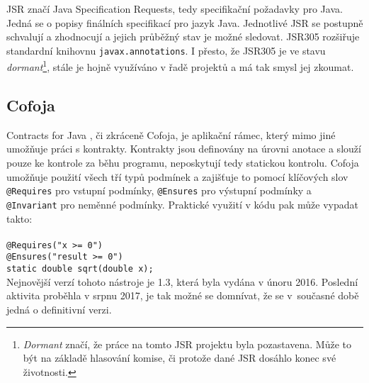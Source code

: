 			JSR značí Java Specification Requests, tedy specifikační požadavky pro Java. Jedná se o popisy finálních specifikací pro jazyk Java. Jednotlivé JSR se postupně schvalují a zhodnocují a jejich průběžný stav je možné sledovat. JSR305 rozšiřuje standardní knihovnu \texttt{javax.annotations}. I přesto, že JSR305 je ve stavu \emph{dormant}\footnote{\emph{Dormant} značí, že práce na tomto JSR projektu byla pozastavena. Může to být na základě hlasování komise, či protože dané JSR dosáhlo konec své životnosti.}, stále je hojně využíváno v řadě projektů a má tak smysl jej zkoumat.
			
	
		\subsection{Cofoja}
			Contracts for Java \cite{cofoja}, či zkráceně Cofoja, je aplikační rámec, který mimo jiné umožňuje práci s kontrakty. Kontrakty jsou definovány na úrovni anotace a slouží pouze ke kontrole za běhu programu, neposkytují tedy statickou kontrolu. Cofoja umožňuje použití všech tří typů podmínek a zajišťuje to pomocí klíčových slov \texttt{@Requires} pro vstupní podmínky, 
\texttt{@Ensures} pro výstupní podmínky a \texttt{@Invariant} pro neměnné podmínky. Praktické využití v kódu pak může vypadat takto:\\\\
				\- \- \- \- \- \texttt{@Requires("x >= 0")}\\
				\- \- \- \- \- \texttt{@Ensures("result >= 0")}\\
				\- \- \- \- \- \texttt{static double sqrt(double x);}\\
				
			Nejnovější verzí tohoto nástroje je 1.3, která byla vydána v únoru 2016. Poslední aktivita proběhla v srpnu 2017, je tak možné se domnívat, že se v~současné době jedná o definitivní verzi.

